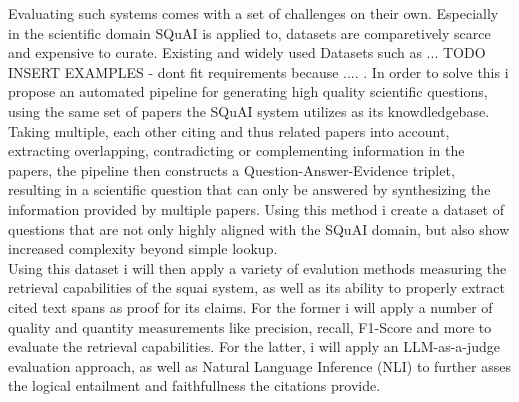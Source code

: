 Evaluating such systems comes with a set of challenges on their own. Especially in the scientific domain SQuAI is applied to, datasets are comparetively scarce and expensive to curate. Existing and widely used Datasets such as ... TODO INSERT EXAMPLES - dont fit requirements because .... . 
In order to solve this i propose an automated pipeline for generating high quality scientific questions, using the same set of papers the SQuAI system utilizes as its knowdledgebase. Taking multiple, each other citing and thus related papers into account, extracting overlapping, contradicting or complementing information in the papers, the pipeline then constructs a Question-Answer-Evidence triplet, resulting in a scientific question that can only be answered by synthesizing the information provided by multiple papers. Using this method i create a dataset of questions that are not only highly aligned with the SQuAI domain, but also show increased complexity beyond  simple lookup.\\
Using this dataset i will then apply a variety of evalution methods measuring the retrieval capabilities of the squai system, as well as its ability to properly extract cited text spans as proof for its claims. For the former i will apply a number of quality and quantity measurements like precision, recall, F1-Score and more to evaluate the retrieval capabilities. For the latter, i will apply an LLM-as-a-judge evaluation approach, as well as Natural Language Inference (NLI) to further asses the logical entailment and faithfullness the citations provide.





%
%
% 
%


%
%
%
%


